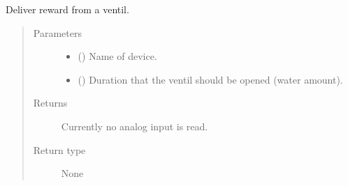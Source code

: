 \documentclass[letterpaper,10pt,english]{sphinxmanual}
\begin{document}

\begin{fulllineitems}
\label{\detokenize{NoSeMazeControl/HelperFunctions:HelperFunctions.Reward.deliver_reward_static}}
\pysigstartsignatures
{}
\pysigstopsignatures
\sphinxAtStartPar
Deliver reward from a ventil.
\begin{quote}\begin{description}
\item[{Parameters}] \leavevmode\begin{itemize}
\item {} 
\sphinxAtStartPar
{} () \textendash{} Name of device.

\item {} 
\sphinxAtStartPar
{} () \textendash{} Duration that the ventil should be opened (water amount).

\end{itemize}

\item[{Returns}] \leavevmode
\sphinxAtStartPar
{} \textendash{} Currently no analog input is read.

\item[{Return type}] \leavevmode
\sphinxAtStartPar
None

\end{description}\end{quote}

\end{fulllineitems}

\end{document}
